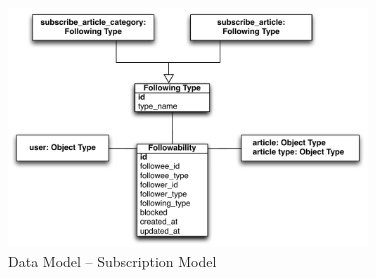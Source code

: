 \begin{figure}[H]
\centering
\includegraphics[width=0.85\textwidth]{img/datamodel/user2article.pdf}
\caption{Data Model -- Subscription Model}
\label{pic:data:user2article}
\end{figure}

